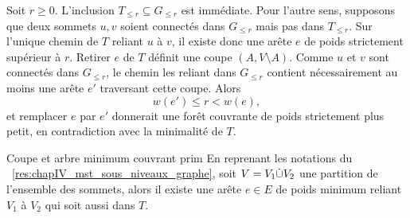 \begin{Preuve}
Soit $r \ge 0$. L'inclusion $T_{\le r}\subseteq G_{\le r}$ est immédiate. Pour l'autre sens, supposons que deux sommets $u,v$ soient connectés dans $G_{\le r}$ mais pas dans $T_{\le r}$. Sur l'unique chemin de $T$ reliant $u$ à $v$, il existe donc une arête $e$ de poids strictement supérieur à $r$. Retirer $e$ de $T$ définit une coupe $(A,V\setminus A)$. Comme $u$ et $v$ sont connectés dans $G_{\le r}$, le chemin les reliant dans $G_{\le r}$ contient nécessairement au moins une arête $e'$ traversant cette coupe. Alors
\[
    w(e')\le r < w(e),
\]
et remplacer $e$ par $e'$ donnerait une forêt couvrante de poids strictement plus petit, en contradiction avec la minimalité de $T$.
\end{Preuve}


\begin{Resultat}{Coupe et arbre minimum couvrant \cite{Prim1957}}{prim}
En reprenant les notations du \Res~\ref{res:chapIV_mst_sous_niveaux_graphe}, soit
 $V =  V_1 \dot \cup V_2$ une partition de l'ensemble des sommets, alors il existe une arête $e \in E$ de poids minimum reliant $V_1$ à $V_2$ qui soit aussi dans $T$.
\end{Resultat}



